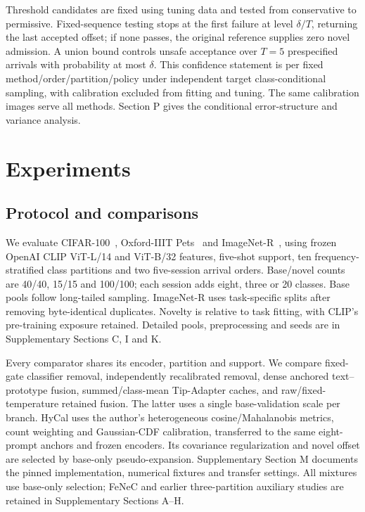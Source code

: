 \documentclass[preprint,review,12pt]{elsarticle}
\begin{document}
Threshold candidates are fixed using tuning data and tested from conservative to permissive. Fixed-sequence testing stops at the first failure at level $\delta/T$, returning the last accepted offset; if none passes, the original reference supplies zero novel admission. A union bound controls unsafe acceptance over $T=5$ prespecified arrivals with probability at most $\delta$. This confidence statement is per fixed method/order/partition/policy under independent target class-conditional sampling, with calibration excluded from fitting and tuning. The same calibration images serve all methods. Section P gives the conditional error-structure and variance analysis.

\section{Experiments}
\subsection{Protocol and comparisons}
\label{sec:tenpartitions}
We evaluate CIFAR-100~\cite{krizhevsky2009cifar}, Oxford-IIIT Pets~\cite{parkhi2012cats} and ImageNet-R~\cite{hendrycks2021manyfaces}, using frozen OpenAI CLIP ViT-L/14 and ViT-B/32 features, five-shot support, ten frequency-stratified class partitions and two five-session arrival orders. Base/novel counts are 40/40, 15/15 and 100/100; each session adds eight, three or 20 classes. Base pools follow long-tailed sampling. ImageNet-R uses task-specific splits after removing byte-identical duplicates. Novelty is relative to task fitting, with CLIP's pre-training exposure retained. Detailed pools, preprocessing and seeds are in Supplementary Sections C, I and K.

Every comparator shares its encoder, partition and support. We compare fixed-gate classifier removal, independently recalibrated removal, dense anchored text--prototype fusion, summed/class-mean Tip-Adapter caches, and raw/fixed-temperature retained fusion. The latter uses a single base-validation scale per branch. HyCal uses the author's heterogeneous cosine/Mahalanobis metrics, count weighting and Gaussian-CDF calibration, transferred to the same eight-prompt anchors and frozen encoders. Its covariance regularization and novel offset are selected by base-only pseudo-expansion. Supplementary Section M documents the pinned implementation, numerical fixtures and transfer settings. All mixtures use base-only selection; FeNeC and earlier three-partition auxiliary studies are retained in Supplementary Sections A--H.
\end{document}
